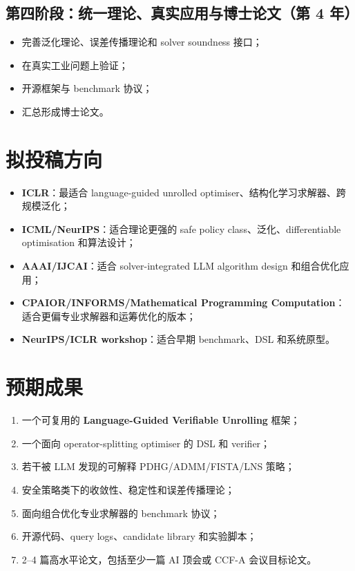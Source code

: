 \documentclass[UTF8,a4paper,12pt,fontset=fandol]{ctexart}
\begin{document}
\subsection{第四阶段：统一理论、真实应用与博士论文（第 4 年）}

\begin{itemize}[leftmargin=2em]
    \item 完善泛化理论、误差传播理论和 solver soundness 接口；
    \item 在真实工业问题上验证；
    \item 开源框架与 benchmark 协议；
    \item 汇总形成博士论文。
\end{itemize}

\section{拟投稿方向}

\begin{itemize}[leftmargin=2em]
    \item \textbf{ICLR}：最适合 language-guided unrolled optimiser、结构化学习求解器、跨规模泛化；
    \item \textbf{ICML/NeurIPS}：适合理论更强的 safe policy class、泛化、differentiable optimisation 和算法设计；
    \item \textbf{AAAI/IJCAI}：适合 solver-integrated LLM algorithm design 和组合优化应用；
    \item \textbf{CPAIOR/INFORMS/Mathematical Programming Computation}：适合更偏专业求解器和运筹优化的版本；
    \item \textbf{NeurIPS/ICLR workshop}：适合早期 benchmark、DSL 和系统原型。
\end{itemize}

\section{预期成果}

\begin{enumerate}[leftmargin=2em]
    \item 一个可复用的 \textbf{Language-Guided Verifiable Unrolling} 框架；
    \item 一个面向 operator-splitting optimiser 的 DSL 和 verifier；
    \item 若干被 LLM 发现的可解释 PDHG/ADMM/FISTA/LNS 策略；
    \item 安全策略类下的收敛性、稳定性和误差传播理论；
    \item 面向组合优化专业求解器的 benchmark 协议；
    \item 开源代码、query logs、candidate library 和实验脚本；
    \item 2--4 篇高水平论文，包括至少一篇 AI 顶会或 CCF-A 会议目标论文。
\end{enumerate}
\end{document}
